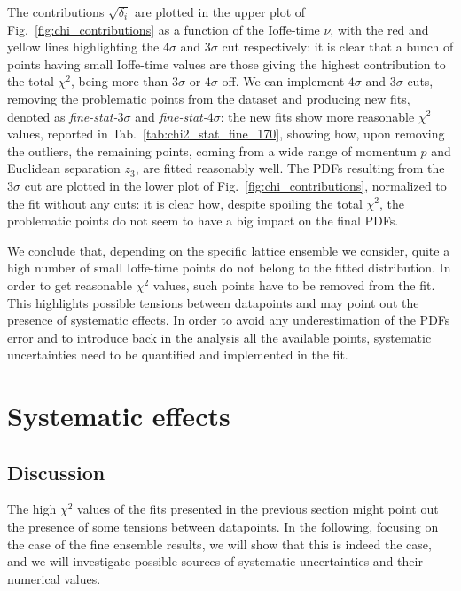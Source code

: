 %
The contributions $\sqrt{\delta_i}$ are plotted in the upper plot of Fig.~\ref{fig:chi_contributions} as a function of the
Ioffe-time $\nu$, with the red and yellow lines highlighting the $4\sigma$ and $3\sigma$ cut respectively:
it is clear that a bunch of points having small Ioffe-time values
are those giving the highest contribution to the total $\chi^2$, being more than $3\sigma$ or $4\sigma$ off.
We can implement $4\sigma$ and $3\sigma$ cuts, removing the problematic points from the dataset and
producing new fits, denoted as \textit{fine-stat-$3\sigma$} and \textit{fine-stat-$4\sigma$}: 
the new fits show more reasonable $\chi^2$ values, reported in Tab.~\ref{tab:chi2_stat_fine_170},
showing how, upon removing the outliers, the remaining points, coming from a wide range of momentum $p$
and Euclidean separation $z_3$, are fitted reasonably well.
The PDFs resulting from the $3\sigma$ cut are plotted in the lower plot of Fig.~\ref{fig:chi_contributions},
normalized to the fit without any cuts: it is clear how, despite spoiling the total $\chi^2$,
the problematic points do not seem to have a big impact on the final PDFs.

%
We conclude that, depending on the specific lattice ensemble we consider, quite a high number of small Ioffe-time points 
do not belong to the fitted distribution.
In order to get reasonable $\chi^2$ values, such points have to be removed from the fit.
This highlights possible tensions between datapoints and may point out the presence 
of systematic effects.
In order to avoid any underestimation of the PDFs error and to introduce back in the analysis all the available points, 
systematic uncertainties need to be quantified and implemented in the fit. 

\section{Systematic effects}
\label{sec:sys_fits}

\subsection{Discussion}
\label{sec:discussion_sys}

The high $\chi^2$ values of the fits presented in the previous section might point out
the presence of some tensions between datapoints.
In the following, focusing on the case of the fine ensemble results, we will show that this is indeed the case, 
and we will investigate possible sources of systematic uncertainties and their numerical values.

